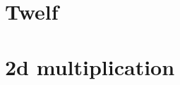 \documentclass[a4paper, oneside, 10pt, final]{memoir}
\begin{document}
\section{Twelf}
\label{appendix:twelf}

\clearpage

\clearpage

\clearpage
\section{2d multiplication}

\end{document}
